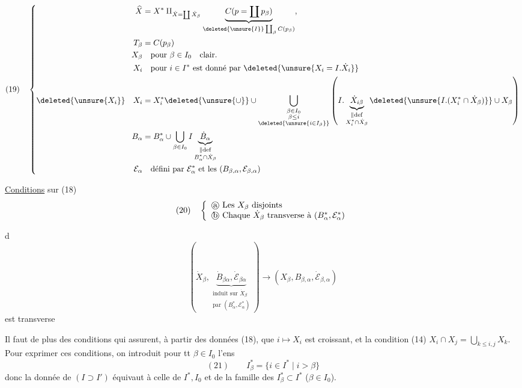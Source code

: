 \[
(19)\quad\left\{
\begin{aligned}
\widehat X&=X^*\amalg_{\dot X=\coprod\dot X_\beta}
\underbrace{C(p=\coprod p_\beta)}
_{\deleted{\unsure{I}}\coprod_\beta C(p_\beta)},\\
T_\beta&=C(p_\beta)\\
X_\beta&\quad\text{pour }\beta\in I_0\quad\text{clair}.\\
X_i&\quad\text{pour }i\in I^*\text{ est donné par }
\deleted{\unsure{X_i=I.\dot X_i}}\\
\deleted{\unsure{X_i}}\quad X_i&=X_i^*\deleted{\unsure{\cup}}
\cup\bigcup_{\substack{\beta\in I_0\\\beta\le i\\\deleted{\unsure{i\in I_\beta}}}}
\left(I.\underbrace{\dot X_{i\beta}}
_{\substack{\parallel\mathrm{def}\\X_i^*\cap\dot X_\beta}}
\deleted{\unsure{I.(X_i^*\cap\dot X_\beta)}}\cup X_\beta\right)\\
B_\alpha&=B_\alpha^*\cup\bigcup_{\beta\in I_0}
I\underbrace{\dot B_\alpha}_{\substack{\parallel\mathrm{def}\\B_\alpha^*\cap\dot X_\beta}}\\
\mathcal E_\alpha&\quad\text{défini par }\mathcal E_\alpha^*
\text{ et les }(B_{\beta,\alpha},\mathcal E_{\beta,\alpha})
\end{aligned}\right.
\]

\uline{Conditions} sur (18)
\[
(20)\quad\left\{
\begin{array}{l}
\text{\textcircled{a} Les }X_\beta\text{ disjoints}\\
\text{\textcircled{b} Chaque }\dot X_\beta\text{ transverse à }(B_\alpha^*,\mathcal E_\alpha^*)
\end{array}\right.
\]

\textcircled{d}
\[
(\dot X_\beta,
\underbrace{\dot B_{\beta\alpha},\dot{\mathcal E}_{\beta\alpha}}
_{\substack{\text{induit sur }\dot X_\beta\\
\text{par }(B_\alpha^*,\mathcal E_\alpha^*)}})
\longrightarrow
(X_\beta,B_{\beta,\alpha},\dot{\mathcal E}_{\beta,\alpha})
\]
est transverse

Il faut de plus des conditions qui assurent,
à partir des données (18), que $i\mapsto X_i$
est croissant, et  la condition (14)
$X_i\cap X_j=\bigcup_{k\le i,j}X_k$. Pour  exprimer ces conditions,
on introduit pour tt $\beta\in I_0$ l'ens
\[
(21)\qquad I_\beta^*=\{i\in I^*\mid i>\beta\}
\]
donc la donnée de $(I\supset I')$
 équivaut à celle
de $I^*,I_0$  et de la famille des
$I_\beta^*\subset I^*$ ($\beta\in I_0$).

